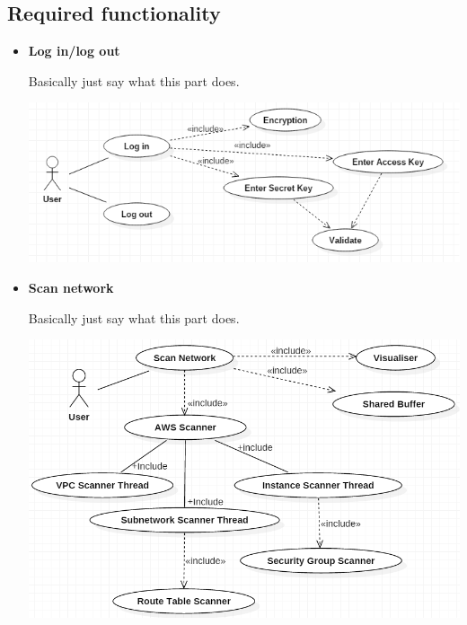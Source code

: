 \documentclass[a4paper,12pt]{report}
\begin{document}
\subsection{Required functionality}
\begin{itemize}
	\item \textbf{Log in/log out}
		\begin{flushleft}
		 Basically just say what this part does. 	
		\end{flushleft}
		\begin{center}
  	 	\includegraphics[width=1\textwidth] {./Diagrams/LoginUseCase.png}\\[0.4cm]    
		\end{center}

	\item \textbf{Scan network}
		\begin{flushleft}
			Basically just say what this part does.
		\end{flushleft}
		\begin{center}
  	 	\includegraphics[width=1\textwidth] {./Diagrams/ScanNetworkUseCase.png}\\[0.4cm]    
		\end{center}


\end{itemize}
\end{document}
